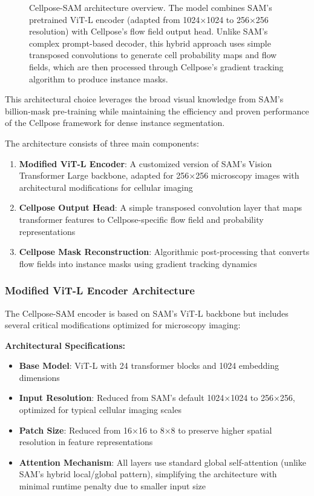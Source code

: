 \documentclass[../cellseek_paper.tex]{subfiles}
\begin{document}
\begin{figure}[h!]
  \centering
  
  \caption{Cellpose-SAM architecture overview. The model combines SAM's pretrained ViT-L encoder (adapted from 1024×1024 to 256×256 resolution) with Cellpose's flow field output head. Unlike SAM's complex prompt-based decoder, this hybrid approach uses simple transposed convolutions to generate cell probability maps and flow fields, which are then processed through Cellpose's gradient tracking algorithm to produce instance masks.}
  \label{fig:cellpose_sam_arch}
\end{figure}

This architectural choice leverages the broad visual knowledge from SAM's billion-mask pre-training while maintaining the efficiency and proven performance of the Cellpose framework for dense instance segmentation.

The architecture consists of three main components:

\begin{enumerate}
  \item \textbf{Modified ViT-L Encoder}: A customized version of SAM's Vision Transformer Large backbone, adapted for 256×256 microscopy images with architectural modifications for cellular imaging
  \item \textbf{Cellpose Output Head}: A simple transposed convolution layer that maps transformer features to Cellpose-specific flow field and probability representations
  \item \textbf{Cellpose Mask Reconstruction}: Algorithmic post-processing that converts flow fields into instance masks using gradient tracking dynamics
\end{enumerate}

\subsubsection{Modified ViT-L Encoder Architecture}

The Cellpose-SAM encoder is based on SAM's ViT-L backbone but includes several critical modifications optimized for microscopy imaging:

\textbf{Architectural Specifications:}
\begin{itemize}
  \item \textbf{Base Model}: ViT-L with 24 transformer blocks and 1024 embedding dimensions
  \item \textbf{Input Resolution}: Reduced from SAM's default 1024×1024 to 256×256, optimized for typical cellular imaging scales
  \item \textbf{Patch Size}: Reduced from 16×16 to 8×8 to preserve higher spatial resolution in feature representations
  \item \textbf{Attention Mechanism}: All layers use standard global self-attention (unlike SAM's hybrid local/global pattern), simplifying the architecture with minimal runtime penalty due to smaller input size
\end{itemize}
\end{document}
